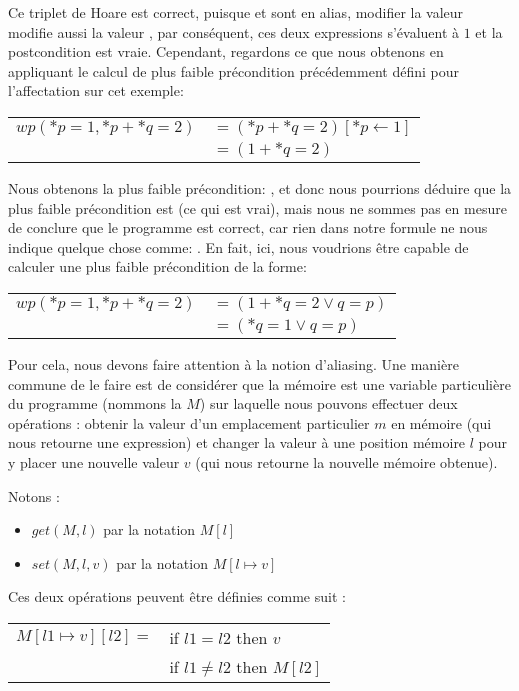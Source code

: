 Ce triplet de Hoare est correct, puisque  et  sont en
alias, modifier la valeur  modifie aussi la valeur ,
par conséquent, ces deux expressions s'évaluent à $1$ et la postcondition est 
vraie. Cependant, regardons ce que nous obtenons en appliquant le calcul de plus
faible précondition précédemment défini pour l'affectation sur cet exemple:


\begin{tabular}{ll}
$wp(*p = 1, *p + *q = 2)$ & $= (*p + *q = 2)[*p \leftarrow 1]$\\
                          & $= (1 + *q = 2)$
\end{tabular}


Nous obtenons la plus faible précondition: , et donc 
nous pourrions déduire que la plus faible précondition est 
(ce qui est vrai), mais nous ne sommes pas en mesure de conclure que le programme
est correct, car rien dans notre formule ne nous indique quelque chose comme:
. En fait, ici, nous voudrions être capable de 
calculer une plus faible précondition de la forme:


\begin{tabular}{ll}
$wp(*p = 1, *p + *q = 2)$ & $= (1 + *q = 2 \vee q = p)$\\
                          & $= (*q = 1 \vee q = p)$
\end{tabular}


Pour cela, nous devons faire attention à la notion d'aliasing. Une manière
commune de le faire est de considérer que la mémoire est une variable particulière
du programme (nommons la $M$) sur laquelle nous pouvons effectuer deux opérations :
obtenir la valeur d'un emplacement particulier $m$ en mémoire (qui nous retourne une
expression) et changer la valeur à une position mémoire $l$ pour y placer une nouvelle
valeur $v$ (qui nous retourne la nouvelle mémoire obtenue).


Notons :


\begin{itemize}
\item $get(M,l)$ par la notation $M[l]$
\item $set(M,l,v)$ par la notation $M[l \mapsto v]$
\end{itemize}


Ces deux opérations peuvent être définies comme suit :


\begin{tabular}{ll}
  $M[l1 \mapsto v][l2] =$ & if $l1   =  l2$ then $v$ \\
                          & if $l1 \neq l2$ then $M[l2]$
\end{tabular}



